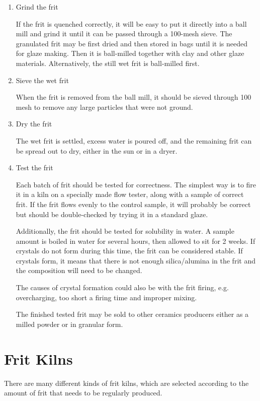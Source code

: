 \begin{enumerate}
\item Grind the frit

If the frit is quenched correctly, it will be easy to put it directly into a 
ball mill and grind it until it can be passed through a 100-mesh sieve. The 
granulated frit may be first dried and then stored in bags until it is needed 
for glaze making. Then it is ball-milled together with clay and other glaze 
materials. Alternatively, the still wet frit is ball-milled first.

\item Sieve the wet frit

When the frit is removed from the ball mill, it should be sieved through 100 
mesh to remove any large particles that were not ground.

\item Dry the frit

The wet frit is settled, excess water is poured off, and the remaining frit can 
be spread out to dry, either in the sun or in a dryer.

\item Test the frit

Each batch of frit should be tested for correctness. The simplest way is to 
fire it in a kiln on a specially made flow tester, along with a sample of 
correct frit. If the frit flows evenly to the control sample, it will probably 
be correct but should be double-checked by trying it in a standard glaze.

Additionally, the frit should be tested for solubility in water. A sample 
amount is boiled in water for several hours, then allowed to sit for 2 weeks. 
If crystals do not form during this time, the frit can be considered stable. If 
crystals form, it means that there is not enough silica/alumina in the frit and 
the composition will need to be changed. 

The causes of crystal formation could also be with the frit firing, e.g. 
overcharging, too short a firing time and improper mixing.

The finished tested frit may be sold to other ceramics producers either as a 
milled powder or in granular form.
\end{enumerate}
\section{Frit Kilns}
There are many different kinds of frit kilns, which are selected according to 
the amount of frit that needs to be regularly produced.

